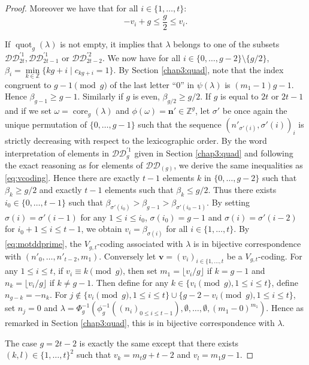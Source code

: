 \documentclass[11pt,letterpaper]{amsart}
\def\bbbz{\mathbb Z}
\def\ccdd{\mathcal {DD}}
\DeclareMathOperator{\core}{core}
\DeclareMathOperator{\quot}{quot}
\numberwithin{equation}{section}
\numberwithin{df}{section}
\begin{document}
\begin{proof}
Moreover we have that for all $i\in\lbrace 1,\dots,t\rbrace$:
\begin{equation}\label{eq:vcoding}
-v_i+g\leq \frac{g}{2}\leq v_i.
\end{equation}



If $\quot_g(\lambda)$ is not empty, it implies that $\lambda$ belongs to one of the subsets $\ccdd_{2t}^{'1},\ccdd_{2t-1}^{'1}$ or $\ccdd_{2t-2}^{'2}$. We now have for all $i\in\lbrace 0,\dots,g-2\rbrace\setminus\lbrace g/2\rbrace$, $\beta_i=\underset{k\in\bbbz}{\min}\lbrace kg+i\mid c_{kg+i}=1\rbrace$. By Section \ref{chap3:quad}, note that the index congruent to $g-1\pmod{g}$ of the last letter ``$0$'' in $\psi(\lambda)$ is $(m_1-1)g-1$. Hence $\beta_{g-1}\geq g-1$. Similarly if $g$ is even, $\beta_{g/2}\geq g/2$. If $g$ is equal to $2t$ or $2t-1$ and if we set $\omega=\core_g(\lambda)$ and $\phi(\omega)=\mathbf{n'}\in\bbbz^{g}$, let $\sigma'$ be once again the unique permutation of $\lbrace 0,\dots,g-1\rbrace$ such that the sequence $(n'_{\sigma'(i)},\sigma'(i))_i$ is strictly decreasing with respect to the lexicographic order. By the word interpretation of elements in $\ccdd_{g}^{'1}$ given in Section \ref{chap3:quad} and following the exact reasoning as for elements of $\ccdd_{(g)}$, we derive the same inequalities as \eqref{eq:vcoding}. Hence there are exactly $t-1$ elements $k$ in $\lbrace 0,\dots,g-2\rbrace$ such that $\beta_k\geq g/2$ and exactly $t-1$ elements such that $\beta_k\leq g/2$.
Thus there exists $i_0\in\lbrace 0,\dots,t-1\rbrace$ such that $\beta_{\sigma'(i_0)}>\beta_{g-1}>\beta_{\sigma'(i_0-1)}$.
By setting $\sigma(i)=\sigma'(i-1)$ for any $1\leq i\leq i_0$, $\sigma(i_0)=g-1$ and $\sigma(i)=\sigma'(i-2)$ for $i_0+1\leq i\leq t-1$, we obtain $v_i=\beta_{\sigma(i)}$ for all $i\in\lbrace 1,\dots,t\rbrace$. By \eqref{eq:motddprime}, the $V_{g,t}$-coding associated with $\lambda$ is in bijective correspondence with $(n'_0,\dots,n'_{t-2},m_1)$.
Conversely let $\mathbf{v}=(v_i)_{i\in\lbrace 1,\dots,t}$ be a $V_{g,t}$-coding. For any $1\leq i\leq t$, if $v_i\equiv k\pmod{g}$, then set $m_1=\lfloor v_i/g\rfloor$ if $k=g-1$ and $n_k=\lfloor v_i/g\rfloor$ if $k\neq g-1$.
Then define for any $k\in\lbrace v_i\pmod{g},1\leq i\leq t\rbrace$, define $n_{g-k}=-n_k$. For $j\not\in \lbrace v_i\pmod{g},1\leq i\leq t\rbrace\cup \lbrace g-2-v_i\pmod{g},1\leq i\leq t\rbrace$, set $n_j=0$ and $\lambda=\Phi_{g}^{-1}\left(\phi_g^{-1}((n_i)_{0\leq i \leq t-1}),\emptyset,\dots,\emptyset,(m_1-0)^{m_1}\right)$.
 Hence as remarked in Section \ref{chap3:quad}, this is in bijective correspondence with $\lambda$.

The case $g=2t-2$ is exactly the same except that there exists $(k,l)\in\lbrace 1,\dots,t\rbrace^2$ such that $v_k=m_tg+t-2$ and $v_l=m_1g-1$.
\end{proof}
%
\end{document}

